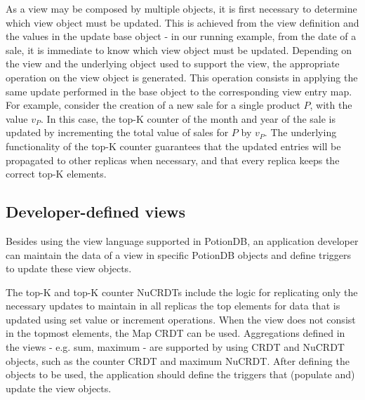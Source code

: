 \documentclass[sigplan,review,anonymous]{acmart}
\begin{document}
As a view may be composed by multiple objects, it is first necessary to 
determine which view object must be updated. This is achieved from the view definition 
and the values in the update base object - in our running example, 
from the date of a sale, it is immediate to know which view object
must be updated.
Depending on the view and the underlying object used to support the view, the appropriate 
operation on the view object is generated.
This operation consists in applying the same update performed in the base object to the 
corresponding view entry map.
For example, consider the creation of a new sale for a single product $P$, with the value $v_P$. 
In this case, the top-K counter of the month and year of the sale is updated by 
incrementing the total value of sales for $P$ by $v_P$. 
The underlying functionality of the top-K counter guarantees that the updated entries
will be propagated to other replicas when necessary, and that every replica keeps the correct top-K
elements.

\subsection{Developer-defined views}
\label{subsec:programmer_view}

Besides using the view language supported in PotionDB, an application developer can
maintain the data of a view in specific PotionDB objects and define triggers to update
these view objects.

The top-K and top-K counter NuCRDTs include the logic for replicating only the necessary 
updates to maintain in all replicas the top elements for data that is updated using set value 
or increment operations.
When the view does not consist in the topmost elements, the Map CRDT can be used.  
Aggregations defined in the views - e.g. sum, maximum - are supported by using CRDT and NuCRDT 
objects, such as the counter CRDT and maximum NuCRDT.
After defining the objects to be used, the application should define the triggers that (populate and) 
update the view objects. 
\end{document}
